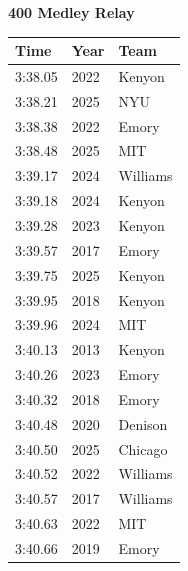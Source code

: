 \noindent\begin{minipage}[t]{0.98\textwidth}
\centering
\textbf{\textcolor{teamprimary}{400 Medley Relay}}\par
\vspace{0.5em}
\centering
\small
\renewcommand{\arraystretch}{1.0}
\setlength{\tabcolsep}{4pt}
\begin{tabular}{@{}p{4.5cm}p{2.5cm}p{4.5cm}@{}}
\toprule
\textbf{Time} & \textbf{Year} & \textbf{Team} \\
\midrule
3:38.05 & 2022 & Kenyon \\
3:38.21 & 2025 & NYU \\
3:38.38 & 2022 & Emory \\
3:38.48 & 2025 & MIT \\
3:39.17 & 2024 & Williams \\
3:39.18 & 2024 & Kenyon \\
3:39.28 & 2023 & Kenyon \\
3:39.57 & 2017 & Emory \\
3:39.75 & 2025 & Kenyon \\
3:39.95 & 2018 & Kenyon \\
3:39.96 & 2024 & MIT \\
3:40.13 & 2013 & Kenyon \\
3:40.26 & 2023 & Emory \\
3:40.32 & 2018 & Emory \\
3:40.48 & 2020 & Denison \\
3:40.50 & 2025 & Chicago \\
3:40.52 & 2022 & Williams \\
3:40.57 & 2017 & Williams \\
3:40.63 & 2022 & MIT \\
3:40.66 & 2019 & Emory \\
\bottomrule
\end{tabular}
\end{minipage}
\clearpage
